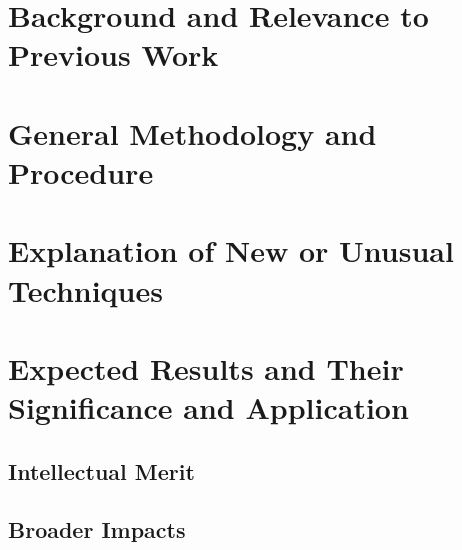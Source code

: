 \documentclass[12pt]{proposal}
\begin{document}
\section*{\large Background and Relevance to Previous Work}

\section*{\large General Methodology and Procedure}

\section*{\large Explanation of New or Unusual Techniques}

\section*{\large Expected Results and Their Significance and Application}

\subsection*{\normalsize Intellectual Merit}

\subsection*{\normalsize Broader Impacts}

\newpage
\singlespacing
{}



\end{document}
